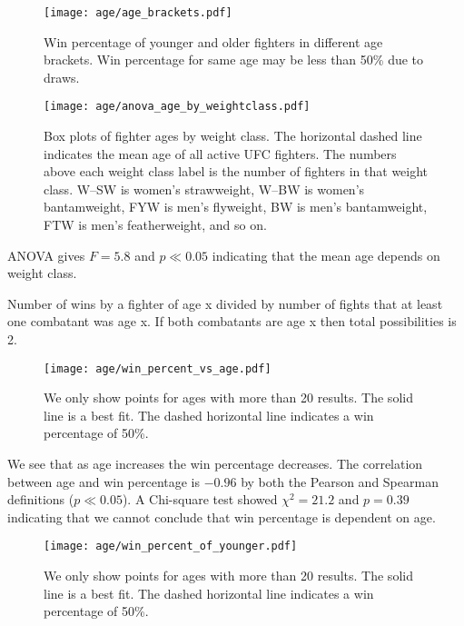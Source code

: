 \begin{figure}[h]
\begin{center}
\texttt{[image: age/age\_brackets.pdf]}
\caption{Win percentage of younger and older fighters
in different age brackets. Win percentage for same
age may be less than 50\% due to draws.}
\label{age_brackets}
\end{center}
\end{figure}

\begin{figure}[h]
\begin{center}
\texttt{[image: age/anova\_age\_by\_weightclass.pdf]}
\caption{Box plots of fighter ages by weight class. The horizontal dashed
line indicates the mean age of all active UFC fighters. The
numbers above each weight class label is the number of fighters
in that weight class. W--SW is women's strawweight, W--BW is women's
bantamweight, FYW is men's flyweight, BW is men's bantamweight, FTW
is men's featherweight, and so on.}
\end{center}
\end{figure}

ANOVA gives $F=5.8$ and $p \ll 0.05$ indicating that the mean age depends on weight class.

Number of wins by a fighter of age x divided by number of
fights that at least one combatant was age x. If both
combatants are age x then total possibilities is 2.

\clearpage

\begin{figure}[h]
\begin{center}
\texttt{[image: age/win\_percent\_vs\_age.pdf]}
\caption{We only show points for ages with more than 20 results. The
solid line is a best fit. The dashed horizontal line indicates
a win percentage of 50\%.}
\end{center}
\end{figure}

We see that as age increases the win percentage decreases. The
correlation between age and win percentage is $-0.96$ by both
the Pearson and Spearman definitions ($p \ll 0.05$). A Chi-square
test showed $\chi^2=21.2$ and $p=0.39$ indicating that we cannot
conclude that win percentage is dependent on age.

\begin{figure}[h]
\begin{center}
\texttt{[image: age/win\_percent\_of\_younger.pdf]}
\caption{We only show points for ages with more than 20 results. The
solid line is a best fit. The dashed horizontal line indicates
a win percentage of 50\%.}
\end{center}
\end{figure}

